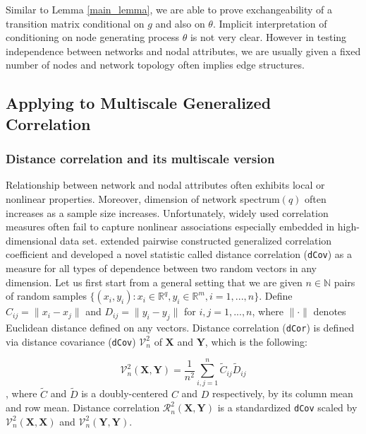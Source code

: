 \documentclass[12pt]{article}
\theoremstyle{definition}
\begin{document}
Similar to Lemma \ref{main_lemma}, we are able to prove exchangeability of a transition matrix conditional on $g$ and also on $\theta$. Implicit interpretation of conditioning on node generating process $\theta$ is not very clear. However in testing independence between networks and nodal attributes, we are usually given a fixed number of nodes and network topology often implies edge structures. 
	
\subsection{Applying to Multiscale Generalized Correlation}
	
\subsubsection{Distance correlation and its multiscale version}
	
Relationship between network and nodal attributes often exhibits local or nonlinear properties. Moreover, dimension of network spectrum$(q)$ often increases as a sample size increases. Unfortunately, widely used correlation measures often fail to capture nonlinear associations especially embedded in high-dimensional data set. \cite{szekely2007measuring} extended pairwise constructed generalized correlation coefficient and developed a novel statistic called distance correlation (\texttt{dCov}) as a measure for all types of dependence between two random vectors in any dimension. Let us first start from a general setting that we are given $n \in \mathbb{N}$ pairs of random samples $\{ (x_{i}, y_{i}) : x_{i} \in \mathbb{R}^{q}, y_{i} \in \mathbb{R}^{m}, i = 1,...,n \}$. Define $C_{ij} = \parallel x_{i} - x_{j} \parallel$ and $D_{ij} = \parallel y_{i} - y_{j} \parallel$ for $i,j=1,...,n$, where $\parallel \cdot \parallel$ denotes Euclidean distance defined on any vectors.   
Distance correlation (\texttt{dCor}) is defined via distance covariance (\texttt{dCov}) $\mathcal{V}^2_{n}$ of $\boldsymbol{X}$ and $\boldsymbol{Y}$, which is the following: 
	
\begin{equation}	 
\mathcal{V}^2_{n}(\boldsymbol{X}, \boldsymbol{Y}) = \frac{1}{n^2} \sum\limits_{i,j=1}^{n} \tilde{C}_{ij} \tilde{D}_{ij}
\end{equation}
, where $\tilde{C}$ and $\tilde{D}$ is a doubly-centered $C$ and $D$ respectively, by its column mean and row mean. Distance correlation $\mathcal{R}^{2}_{n}(\boldsymbol{X}, \boldsymbol{Y})$ is a standardized \texttt{dCov} scaled by $\mathcal{V}^2_{n}(\boldsymbol{X}, \boldsymbol{X})$ and $\mathcal{V}^2_{n}(\boldsymbol{Y}, \boldsymbol{Y}).$
	
\end{document}
